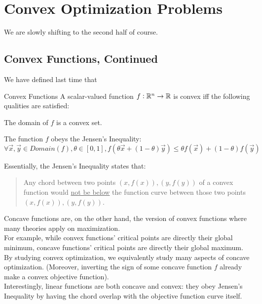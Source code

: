 \chapter{Convex Optimization Problems}
We are slowly shifting to the second half of course.

\section{Convex Functions, Continued}
We have defined last time that
\begin{ln-define}{Convex Functions}{}
    A scalar-valued function $f: \mathbb{R}^n \rightarrow \mathbb{R}$ is convex iff the following qualities are satisfied:
    \begin{bindenum}
        \item The domain of $f$ is a convex set.
        \item The function $f$ obeys the Jensen's Inequality:
        \[
            \forall \vec{x}, \vec{y} \in Domain(f), \theta \in [0, 1], f(\theta \vec{x} + (1 - \theta) \vec{y}) \leq \theta f(\vec{x}) + (1 - \theta) f(\vec{y})
        \]
    \end{bindenum}
    Essentially, the Jensen's Inequality states that:
    \begin{quote}
        Any chord between two points $(x, f(x)), (y, f(y))$ of a convex function would \underline{not be below} the function curve between those two points $(x, f(x)), (y, f(y))$.
    \end{quote}
\end{ln-define}
Concave functions are, on the other hand, the version of convex functions where many theories apply on maximization. \\
For example, while convex functions' critical points are directly their global minimum, concave functions' critical points are directly their global maximum. \\
By studying convex optimization, we equivalently study many aspects of concave optimization.
(Moreover, inverting the sign of some concave function $f$ already make a convex objective function). \\
Interestingly, linear functions are both concave and convex: they obey Jensen's Inequality by having the chord overlap with the objective function curve itself.


